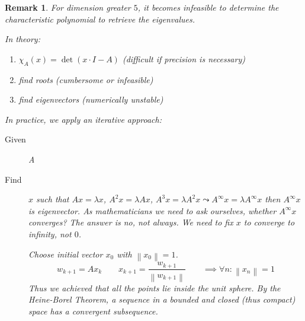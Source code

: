 \documentclass[a4paper]{article}
\newcounter{lecref}[section]
\numberwithin{lecref}{section}
\newtheorem{remark}[lecref]{Remark}
\newcommand{\norm}[1]{\left\|#1\right\|}
\begin{document}
\begin{remark} %
  For dimension greater $5$, it becomes infeasible to determine the characteristic polynomial to retrieve the eigenvalues.

  In theory:
  \begin{enumerate}
    \item $\chi_A(x) = \det(x \cdot I - A)$ (difficult if precision is necessary)
    \item find roots (cumbersome or infeasible)
    \item find eigenvectors (numerically unstable)
  \end{enumerate}

  In practice, we apply an iterative approach:
  \begin{description}
    \item[Given] A
    \item[Find] $x$ such that $Ax = \lambda x$, $A^2 x = \lambda Ax$, $A^3 x = \lambda A^2 x \leadsto A^\infty x = \lambda A^\infty x$ then $A^\infty x$ is eigenvector. As mathematicians we need to ask ourselves, whether $A^\infty x$ converges? The answer is no, not always. We need to fix $x$ to converge to infinity, not $0$.

    Choose initial vector $x_0$ with $\norm{x_0} = 1$.
    \[ w_{k+1} = Ax_k \qquad x_{k+1} = \frac{w_{k+1}}{\norm{w_{k+1}}} \qquad \implies \forall n: \norm{x_n} = 1 \]
    Thus we achieved that all the points lie inside the unit sphere.
    By the Heine-Borel Theorem, a sequence in a bounded and closed (thus compact) space has a convergent subsequence.


\end{description}
\end{remark}
\end{document}

